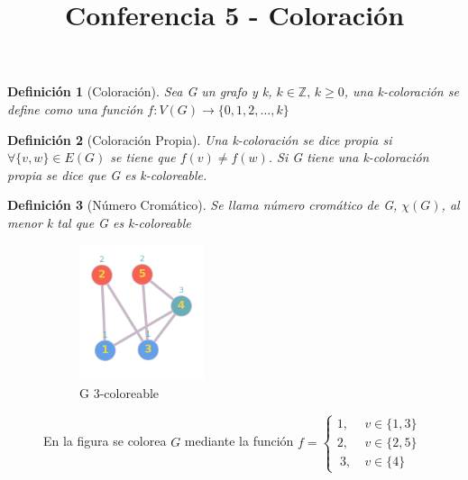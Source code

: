 \documentclass[a4paper,1pt]{report}
\title{Conferencia 5 - Coloración}
\author{}
\newtheorem*{dfn}{Definición}
\begin{document}
\maketitle

\begin{dfn}[Coloraci\'on]
 Sea G un grafo y k, $k\in\mathbb{Z},\,k\geq 0$, una k-coloración se define como una función
 $f:V(G)\rightarrow\{0,1,2,\dots,k\}$
\end{dfn}

\begin{dfn}[Coloraci\'on Propia]
 Una k-coloración se dice propia si $\forall \{v,w\}\in E(G)$ se tiene que $f(v)\neq f(w)$. Si G tiene una k-coloración propia se dice que G es k-coloreable.
\end{dfn}

\begin{dfn}[N\'umero Crom\'atico]
 Se llama número cromático de G, $\chi (G)$, al menor k tal que G es k-coloreable
\end{dfn}


\begin{figure}[H]
    \centering
    \begin{subfigure}[b]{0.45\textwidth}
    \centering
    \includegraphics[width=0.4\textwidth]{figures6/GCol.png}
    \caption{G 3-coloreable}
    \end{subfigure}
    \caption{En la figura se colorea $G$ mediante la funci\'on $f= \left\{\begin{aligned} 1, &\ v \in \{1,3\}\\
                                                                                          2, &\ v \in \{2,5\} \\\
                                                                                          3, &\ v \in \{4\}\end{aligned}\right.$}
\end{figure} 
\end{document}
